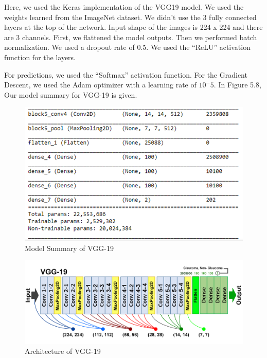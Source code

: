 \vspace{5mm}
Here, we used the Keras implementation of the VGG19 model. We used the weights learned from the ImageNet dataset. We didn’t use the 3 fully connected layers at the top of the network. Input shape of the images is 224 x 224 and there are 3 channels. First, we flattened the model outputs. Then we performed batch normalization. We used a dropout rate of 0.5. We used the “ReLU” activation function for the layers.

\vspace{5mm}
For predictions, we used the “Softmax” activation function. For the Gradient Descent, we used the Adam optimizer with a learning rate of \(10^-5\). In Figure 5.8, Our model summary for VGG-19 is given.

\vspace{5mm}
\begin{figure}[hbt!]
\centering
\includegraphics[scale=1]{images/fig-12.png}
\caption{Model Summary of VGG-19}
\label{fig:x Model Summary of VGG-19}
\end{figure}

\vspace{5mm}
\begin{figure}[hbt!]
\centering
\includegraphics[scale=0.75]{images/Architecture of VGG-19.png}
\caption{Architecture of VGG-19}
\label{fig:x Architecture of VGG-19}
\end{figure}

